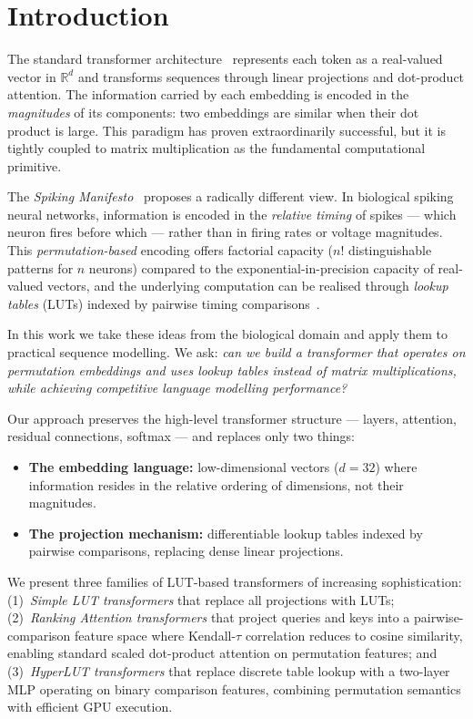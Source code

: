 \documentclass[11pt]{article}
\begin{document}
\section{Introduction}
\label{sec:intro}

The standard transformer architecture~\cite{ref:vaswani} represents each token as a real-valued vector in $\mathbb{R}^d$ and transforms sequences through linear projections and dot-product attention.
The information carried by each embedding is encoded in the \emph{magnitudes} of its components: two embeddings are similar when their dot product is large.
This paradigm has proven extraordinarily successful, but it is tightly coupled to matrix multiplication as the fundamental computational primitive.

The \emph{Spiking Manifesto}~\cite{ref:manifesto} proposes a radically different view.
In biological spiking neural networks, information is encoded in the \emph{relative timing} of spikes --- which neuron fires before which --- rather than in firing rates or voltage magnitudes.
This \emph{permutation-based} encoding offers factorial capacity ($n!$ distinguishable patterns for $n$ neurons) compared to the exponential-in-precision capacity of real-valued vectors, and the underlying computation can be realised through \emph{lookup tables} (LUTs) indexed by pairwise timing comparisons~\cite{ref:manifesto}.

In this work we take these ideas from the biological domain and apply them to practical sequence modelling.
We ask: \emph{can we build a transformer that operates on permutation embeddings and uses lookup tables instead of matrix multiplications, while achieving competitive language modelling performance?}

Our approach preserves the high-level transformer structure --- layers, attention, residual connections, softmax --- and replaces only two things:
\begin{itemize}
    \item \textbf{The embedding language:} low-dimensional vectors ($d=32$) where information resides in the relative ordering of dimensions, not their magnitudes.
    \item \textbf{The projection mechanism:} differentiable lookup tables indexed by pairwise comparisons, replacing dense linear projections.
\end{itemize}

We present three families of LUT-based transformers of increasing sophistication:
(1)~\emph{Simple LUT transformers} that replace all projections with LUTs;
(2)~\emph{Ranking Attention transformers} that project queries and keys into a pairwise-comparison feature space where Kendall-$\tau$ correlation reduces to cosine similarity, enabling standard scaled dot-product attention on permutation features;
and (3)~\emph{HyperLUT transformers} that replace discrete table lookup with a two-layer MLP operating on binary comparison features, combining permutation semantics with efficient GPU execution.
\end{document}
